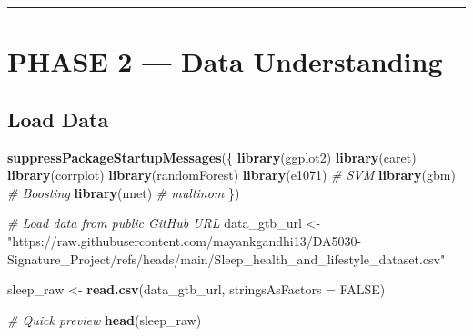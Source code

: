 \documentclass[
]{article}
\newenvironment{Shaded}{\begin{snugshade}}{\end{snugshade}}
\newcommand{\AttributeTok}[1]{\textcolor[rgb]{0.13,0.29,0.53}{#1}}
\newcommand{\CommentTok}[1]{\textcolor[rgb]{0.56,0.35,0.01}{\textit{#1}}}
\newcommand{\ConstantTok}[1]{\textcolor[rgb]{0.56,0.35,0.01}{#1}}
\newcommand{\FunctionTok}[1]{\textcolor[rgb]{0.13,0.29,0.53}{\textbf{#1}}}
\newcommand{\NormalTok}[1]{#1}
\newcommand{\OtherTok}[1]{\textcolor[rgb]{0.56,0.35,0.01}{#1}}
\newcommand{\StringTok}[1]{\textcolor[rgb]{0.31,0.60,0.02}{#1}}
\begin{document}
\begin{center}\rule{0.5\linewidth}{0.5pt}\end{center}

\section{\texorpdfstring{\textbf{PHASE 2 --- Data
Understanding}}{PHASE 2 --- Data Understanding}}\label{phase-2-data-understanding}

\subsection{Load Data}\label{load-data}

\begin{Shaded}
\begin{Highlighting}[]
\FunctionTok{suppressPackageStartupMessages}\NormalTok{(\{}
  \FunctionTok{library}\NormalTok{(ggplot2)}
  \FunctionTok{library}\NormalTok{(caret)}
  \FunctionTok{library}\NormalTok{(corrplot)}
  \FunctionTok{library}\NormalTok{(randomForest)}
  \FunctionTok{library}\NormalTok{(e1071)   }\CommentTok{\# SVM}
  \FunctionTok{library}\NormalTok{(gbm)     }\CommentTok{\# Boosting}
  \FunctionTok{library}\NormalTok{(nnet)   }\CommentTok{\# multinom}
\NormalTok{\})}


\CommentTok{\# Load data from public GitHub URL}
\NormalTok{data\_gtb\_url }\OtherTok{\textless{}{-}} \StringTok{"https://raw.githubusercontent.com/mayankgandhi13/DA5030{-}Signature\_Project/refs/heads/main/Sleep\_health\_and\_lifestyle\_dataset.csv"}

\NormalTok{sleep\_raw }\OtherTok{\textless{}{-}} \FunctionTok{read.csv}\NormalTok{(data\_gtb\_url, }
                      \AttributeTok{stringsAsFactors =} \ConstantTok{FALSE}\NormalTok{)}

\CommentTok{\# Quick preview}
\FunctionTok{head}\NormalTok{(sleep\_raw)}
\end{Highlighting}
\end{Shaded}
\end{document}
